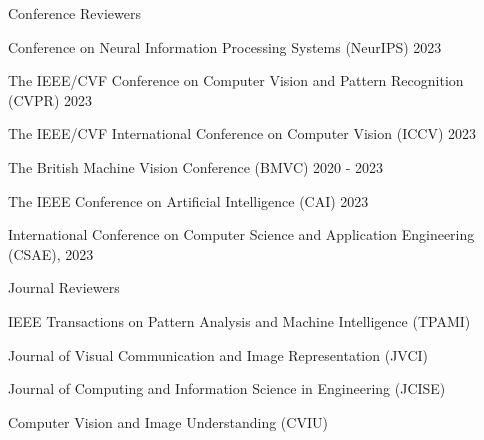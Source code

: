 


\begin{cventries}

\cvpub
{Conference Reviewers} %
{ %
\begin{cvitems}
    \item {Conference on Neural Information Processing Systems (NeurIPS) 2023}
    \item {The IEEE/CVF Conference on Computer Vision and Pattern Recognition (CVPR) 2023}
    \item {The IEEE/CVF International Conference on Computer Vision (ICCV) 2023}
    \item {The British Machine Vision Conference (BMVC) 2020 - 2023}
    \item {The IEEE Conference on Artificial Intelligence (CAI) 2023}
    \item {International Conference on Computer Science and Application Engineering (CSAE), 2023}
\end{cvitems}
}
\cvpub
{Journal Reviewers} %
{
\begin{cvitems}
    \item {IEEE Transactions on Pattern Analysis and Machine Intelligence (TPAMI)}
    \item {Journal of Visual Communication and Image Representation (JVCI)}
    \item {Journal of Computing and Information Science in Engineering (JCISE)}
    \item {Computer Vision and Image Understanding (CVIU)}
\end{cvitems}
}
\end{cventries}

